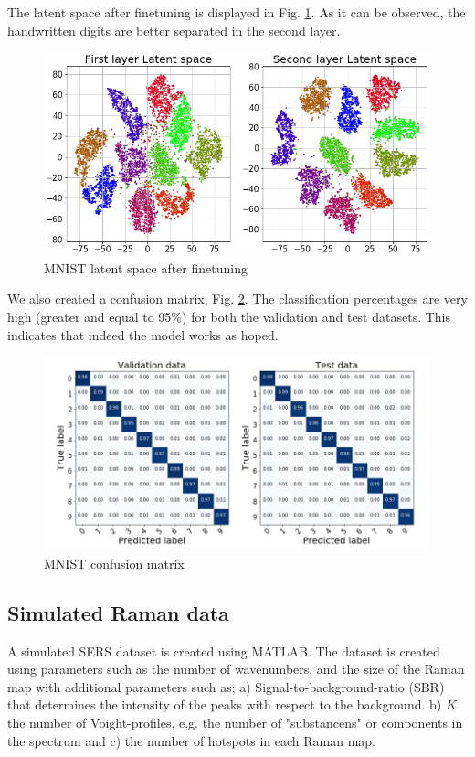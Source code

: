 \documentclass{article}
\begin{document}
The latent space after finetuning is displayed in Fig. \ref{fig:separationMNIST}. As it can be observed, the handwritten digits are better separated in the second layer.
\begin{figure}[H]
	\centering
	\includegraphics[width=1\linewidth]{latent_space_finetune_no_legend.png}  
	\caption{MNIST latent space after finetuning}
	\label{fig:separationMNIST} 
\end{figure}

We also created a confusion matrix, Fig. \ref{fig:confusionMNIST}. The classification percentages are very high (greater and equal to 95\%) for both the validation and test datasets. This indicates that indeed the model works as hoped.

\begin{figure}[H]
   \centering
	\includegraphics[width=1\linewidth]{Confusion_matrix_fine_tune_2.png}  
	\caption{MNIST confusion matrix}
	\label{fig:confusionMNIST} 
\end{figure}


\subsection{Simulated Raman data}
A simulated SERS dataset is created using MATLAB. The dataset is created using parameters such as the number of wavenumbers, and the size of the Raman map with additional parameters such as; a) Signal-to-background-ratio (SBR) that determines the intensity of the peaks with respect to the background. b) $K$ the number of Voight-profiles, e.g. the number of "substancens" or components in the spectrum and c) the number of hotspots in each Raman map.
\end{document}
